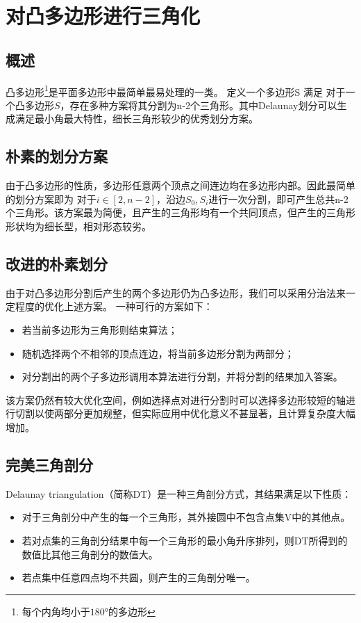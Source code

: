 
\chapter{对凸多边形进行三角化}

\section{概述}
凸多边形\footnote{每个内角均小于\(180°\)的多边形}是平面多边形中最简单最易处理的一类。
定义一个多边形S 满足
对于一个凸多边形\(S\)，存在多种方案将其分割为n-2个三角形。其中Delaunay划分可以生成满足最小角最大特性，细长三角形较少的优秀划分方案。

\section{朴素的划分方案}

由于凸多边形的性质，多边形任意两个顶点之间连边均在多边形内部。因此最简单的划分方案即为 对于\(i\in [2,n-2]\)，沿边\(S_0,S_i\)进行一次分割，即可产生总共n-2个三角形。该方案最为简便，且产生的三角形均有一个共同顶点，但产生的三角形形状均为细长型，相对形态较劣。

\section{改进的朴素划分}

由于对凸多边形分割后产生的两个多边形仍为凸多边形，我们可以采用分治法来一定程度的优化上述方案。
一种可行的方案如下：
\begin{itemize}
    \item 若当前多边形为三角形则结束算法；
    \item 随机选择两个不相邻的顶点连边，将当前多边形分割为两部分；
    \item 对分割出的两个子多边形调用本算法进行分割，并将分割的结果加入答案。
\end{itemize}

该方案仍然有较大优化空间，例如选择点对进行分割时可以选择多边形较短的轴进行切割以使两部分更加规整，但实际应用中优化意义不甚显著，且计算复杂度大幅增加。

\section{完美三角剖分}
Delaunay triangulation（简称DT）是一种三角剖分方式，其结果满足以下性质：
\begin{itemize}
    \item 对于三角剖分中产生的每一个三角形，其外接圆中不包含点集V中的其他点。
    \item 若对点集的三角剖分结果中每一个三角形的最小角升序排列，则DT所得到的数值比其他三角剖分的数值大。
    \item 若点集中任意四点均不共圆，则产生的三角剖分唯一。
\end{itemize}

